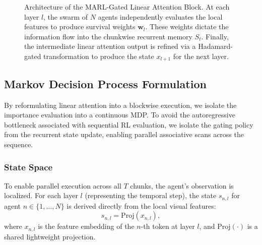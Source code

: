 \begin{figure}[ht]

	\caption{Architecture of the MARL-Gated Linear Attention Block. At each layer $l$, the swarm of $N$ agents independently evaluates the local features to produce survival weights $\mathbf{w}_l$. These weights dictate the information flow into the chunkwise recurrent memory $S_t$. Finally, the intermediate linear attention output is refined via a Hadamard-gated transformation to produce the state $x_{l+1}$ for the next layer.}
	\label{fig:architecture}
\end{figure}
\subsection{Markov Decision Process Formulation}

By reformulating linear attention into a blockwise execution, we isolate the importance evaluation into a continuous MDP. To avoid the autoregressive bottleneck associated with sequential RL evaluation, we isolate the gating policy from the recurrent state update, enabling parallel associative scans across the sequence.

\subsubsection{State Space}
To enable parallel execution across all $T$ chunks, the agent's observation is localized. For each layer $l$ (representing the temporal step), the state $s_{n,l}$ for agent $n \in \{1,\dots,N\}$ is derived directly from the local visual features:
\begin{equation}
	s_{n,l} = \mathrm{Proj}(x_{n,l}),
\end{equation}
where $x_{n,l}$ is the feature embedding of the $n$-th token at layer $l$, and $\mathrm{Proj}(\cdot)$ is a shared lightweight projection.

